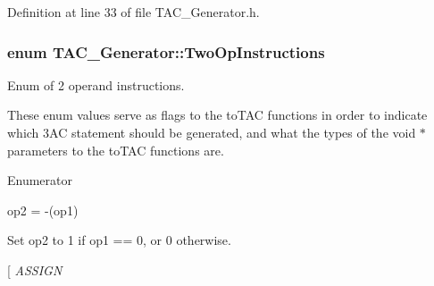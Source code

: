 Definition at line 33 of file T\-A\-C\-\_\-\-Generator.\-h.

\hypertarget{classTAC__Generator_a4e5a63c4a55a85d34f6ffebe5bf48129}{
\subsubsection[{Two\-Op\-Instructions}]{\setlength{\rightskip}{0pt plus 5cm}enum {\bf T\-A\-C\-\_\-\-Generator\-::\-Two\-Op\-Instructions}}}\label{classTAC__Generator_a4e5a63c4a55a85d34f6ffebe5bf48129}


Enum of 2 operand instructions. 

These enum values serve as flags to the to\-T\-A\-C functions in order to indicate which 3\-A\-C statement should be generated, and what the types of the void $\ast$ parameters to the to\-T\-A\-C functions are. \begin{Desc}
\item[Enumerator]\par
\begin{description}
\item[{\em 
\hypertarget{classTAC__Generator_a4e5a63c4a55a85d34f6ffebe5bf48129a308b492d7046c1f465e6219b0bf7bce8}{N\-E\-G}\label{classTAC__Generator_a4e5a63c4a55a85d34f6ffebe5bf48129a308b492d7046c1f465e6219b0bf7bce8}
}]op2 = -\/(op1) \item[{\em 
\hypertarget{classTAC__Generator_a4e5a63c4a55a85d34f6ffebe5bf48129a05adc6809a4b013f033bba555e2bafde}{N\-O\-T}\label{classTAC__Generator_a4e5a63c4a55a85d34f6ffebe5bf48129a05adc6809a4b013f033bba555e2bafde}
}]Set op2 to 1 if op1 == 0, or 0 otherwise. \item[{\em 
\hypertarget{classTAC__Generator_a4e5a63c4a55a85d34f6ffebe5bf48129a0aa9de21ced06e060900ea369cd0a203}{A\-S\-S\-I\-G\-N}\label{classTAC__Generator_a4e5a63c4a55a85d34f6ffebe5bf48129a0aa9de21ced06e060900ea369cd0a203}
}
\end{description}
\end{Desc}
